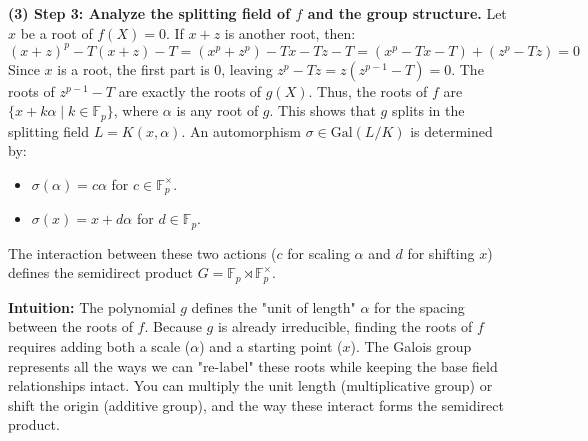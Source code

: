 \begin{solution}
\textbf{(3) Step 3: Analyze the splitting field of $f$ and the group structure.}
Let $x$ be a root of $f(X) = 0$. If $x+z$ is another root, then:
\[ (x+z)^p - T(x+z) - T = (x^p + z^p) - Tx - Tz - T = (x^p - Tx - T) + (z^p - Tz) = 0 \]
Since $x$ is a root, the first part is $0$, leaving $z^p - Tz = z(z^{p-1} - T) = 0$.
The roots of $z^{p-1} - T$ are exactly the roots of $g(X)$.
Thus, the roots of $f$ are $\{x + k\alpha \mid k \in \mathbb{F}_p\}$, where $\alpha$ is any root of $g$.
This shows that $g$ splits in the splitting field $L = K(x, \alpha)$.
An automorphism $\sigma \in \text{Gal}(L/K)$ is determined by:
\begin{itemize}
    \item $\sigma(\alpha) = c\alpha$ for $c \in \mathbb{F}_p^\times$.
    \item $\sigma(x) = x + d\alpha$ for $d \in \mathbb{F}_p$.
\end{itemize}
The interaction between these two actions ($c$ for scaling $\alpha$ and $d$ for shifting $x$) defines the semidirect product $G = \mathbb{F}_p \rtimes \mathbb{F}_p^\times$.

\textbf{Intuition:}
The polynomial $g$ defines the "unit of length" $\alpha$ for the spacing between the roots of $f$. Because $g$ is already irreducible, finding the roots of $f$ requires adding both a scale ($\alpha$) and a starting point ($x$). The Galois group represents all the ways we can "re-label" these roots while keeping the base field relationships intact. You can multiply the unit length (multiplicative group) or shift the origin (additive group), and the way these interact forms the semidirect product.
\end{solution}

